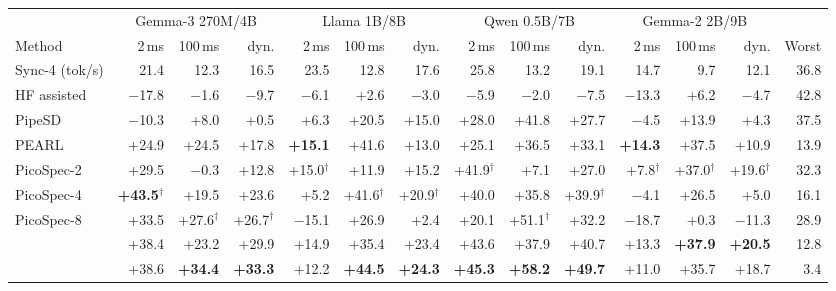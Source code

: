 \begin{tabular}{@{}lrrrrrrrrrrrrr@{}}
\toprule
 & \multicolumn{3}{c}{Gemma-3 270M/4B} & \multicolumn{3}{c}{Llama 1B/8B} & \multicolumn{3}{c}{Qwen 0.5B/7B} & \multicolumn{3}{c}{Gemma-2 2B/9B} & \\
\cmidrule(lr){2-4}\cmidrule(lr){5-7}\cmidrule(lr){8-10}\cmidrule(lr){11-13}
Method & 2\,ms & 100\,ms & dyn. & 2\,ms & 100\,ms & dyn. & 2\,ms & 100\,ms & dyn. & 2\,ms & 100\,ms & dyn. & Worst\\
\midrule
Sync-4 (tok/s) & 21.4 & 12.3 & 16.5 & 23.5 & 12.8 & 17.6 & 25.8 & 13.2 & 19.1 & 14.7 & 9.7 & 12.1 & 36.8\\
\midrule
HF assisted & $-$17.8 & $-$1.6 & $-$9.7 & $-$6.1 & +2.6 & $-$3.0 & $-$5.9 & $-$2.0 & $-$7.5 & $-$13.3 & +6.2 & $-$4.7 & 42.8\\
PipeSD & $-$10.3 & +8.0 & +0.5 & +6.3 & +20.5 & +15.0 & +28.0 & +41.8 & +27.7 & $-$4.5 & +13.9 & +4.3 & 37.5\\
PEARL & +24.9 & +24.5 & +17.8 & \textbf{+15.1} & +41.6 & +13.0 & +25.1 & +36.5 & +33.1 & \textbf{+14.3} & +37.5 & +10.9 & 13.9\\
PicoSpec-2 & +29.5 & $-$0.3 & +12.8 & +15.0$^\dagger$ & +11.9 & +15.2 & +41.9$^\dagger$ & +7.1 & +27.0 & +7.8$^\dagger$ & +37.0$^\dagger$ & +19.6$^\dagger$ & 32.3\\
PicoSpec-4 & \textbf{+43.5$^\dagger$} & +19.5 & +23.6 & +5.2 & +41.6$^\dagger$ & +20.9$^\dagger$ & +40.0 & +35.8 & +39.9$^\dagger$ & $-$4.1 & +26.5 & +5.0 & 16.1\\
PicoSpec-8 & +33.5 & +27.6$^\dagger$ & +26.7$^\dagger$ & $-$15.1 & +26.9 & +2.4 & +20.1 & +51.1$^\dagger$ & +32.2 & $-$18.7 & +0.3 & $-$11.3 & 28.9\\
\midrule
\capee{} & +38.4 & +23.2 & +29.9 & +14.9 & +35.4 & +23.4 & +43.6 & +37.9 & +40.7 & +13.3 & \textbf{+37.9} & \textbf{+20.5} & 12.8\\
\capes{} & +38.6 & \textbf{+34.4} & \textbf{+33.3} & +12.2 & \textbf{+44.5} & \textbf{+24.3} & \textbf{+45.3} & \textbf{+58.2} & \textbf{+49.7} & +11.0 & +35.7 & +18.7 & 3.4\\
\bottomrule
\end{tabular}
